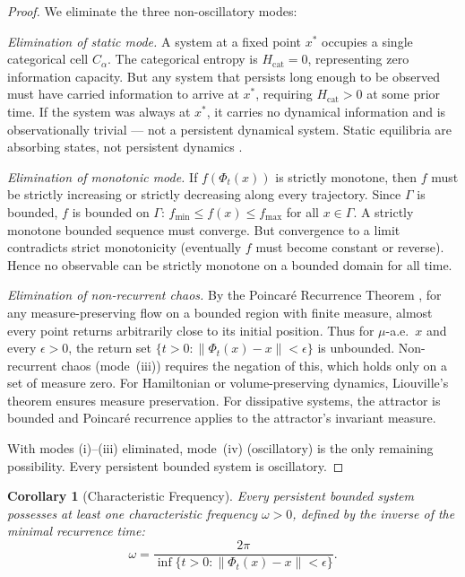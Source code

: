 \documentclass[11pt,twocolumn,a4paper]{article}
\newtheorem{corollary}[theorem]{Corollary}
\begin{document}
\begin{proof}
We eliminate the three non-oscillatory modes:

\textit{Elimination of static mode.}
A system at a fixed point $x^*$ occupies a single categorical cell
$C_\alpha$. The categorical entropy is $H_{\mathrm{cat}} = 0$,
representing zero information capacity. But any system that persists
long enough to be observed must have carried information to arrive at
$x^*$, requiring $H_{\mathrm{cat}} > 0$ at some prior time. If the
system was always at $x^*$, it carries no dynamical information and is
observationally trivial --- not a persistent dynamical system. Static
equilibria are absorbing states, not persistent dynamics
\citep{strogatz2015}.

\textit{Elimination of monotonic mode.}
If $f(\Phi_t(x))$ is strictly monotone, then $f$ must be strictly
increasing or strictly decreasing along every trajectory. Since
$\Gamma$ is bounded, $f$ is bounded on $\Gamma$: $f_{\min} \leq f(x)
\leq f_{\max}$ for all $x \in \Gamma$. A strictly monotone bounded
sequence must converge. But convergence to a limit contradicts strict
monotonicity (eventually $f$ must become constant or reverse). Hence no
observable can be strictly monotone on a bounded domain for all time.

\textit{Elimination of non-recurrent chaos.}
By the Poincar\'{e} Recurrence Theorem \citep{poincare1890}, for any
measure-preserving flow on a bounded region with finite measure, almost
every point returns arbitrarily close to its initial position. Thus for
$\mu$-a.e.\ $x$ and every $\epsilon > 0$, the return set $\{t > 0 :
\|\Phi_t(x) - x\| < \epsilon\}$ is unbounded. Non-recurrent chaos
(mode~(iii)) requires the negation of this, which holds only on a set
of measure zero. For Hamiltonian or volume-preserving dynamics,
Liouville's theorem ensures measure preservation. For dissipative
systems, the attractor is bounded and Poincar\'{e} recurrence applies
to the attractor's invariant measure.

With modes (i)--(iii) eliminated, mode~(iv) (oscillatory) is the only
remaining possibility. Every persistent bounded system is oscillatory.
\end{proof}

\begin{corollary}[Characteristic Frequency]
\label{cor:frequency}
Every persistent bounded system possesses at least one characteristic
frequency $\omega > 0$, defined by the inverse of the minimal
recurrence time:
\begin{equation}
\omega = \frac{2\pi}{\inf\{t > 0 : \|\Phi_t(x) - x\| < \epsilon\}}.
\label{eq:characteristic-freq}
\end{equation}
\end{corollary}
\end{document}
